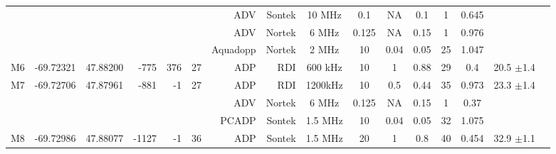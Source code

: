 \documentclass[letterpaper,10pt,landscape]{article}
\begin{document}
\begin{table}
\begin{tabular}{|r|c|c|r|r|r|r|r|c|c|c|c|c|c|c|c|}
    ~                   &                            &                           &                        &                      &                     & ADV          & Sontek     & 10 MHz    & 0.1       & NA       & 0.1        & 1          & 0.645      &                                    \\ 
    ~                   &                            &                           &                        &                      &                     & ADV          & Nortek     & 6 MHz     & 0.125     & NA       & 0.15       & 1          & 0.976      &                                    \\ %
    ~                   &                            &                           &                        &                      &                     & Aquadopp     & Nortek     & 2 MHz     & 10        & 0.04     & 0.05       & 25         & 1.047      &                                    \\\hline
    M6                  & -69.72321                  & 47.88200                  & -775                   & 376                  & 27                  & ADP          & RDI        & 600 kHz   & 10        & 1        & 0.88       & 29         & 0.4        &  20.5 $\pm$1.4                     \\\hline
    \multirow{3}{*}{M7} & \multirow{3}{*}{-69.72706} & \multirow{3}{*}{47.87961} & \multirow{3}{*}{-881}  & \multirow{3}{*}{-1}  & \multirow{3}{*}{27} & ADP          & RDI        & 1200kHz   & 10        & 0.5      & 0.44       & 35         & 0.973      &  \multirow{3}{*}{23.3 $\pm$1.4}    \\ 
    ~                   &                            &                           &                        &                      &                     & ADV          & Nortek     & 6 MHz     & 0.125     & NA       & 0.15       & 1          & 0.37       &                                    \\ %
    ~                   &                            &                           &                        &                      &                     & PCADP        & Sontek     & 1.5 MHz   & 10        & 0.04     & 0.05       & 32         & 1.075      &                                    \\\hline
    \multirow{4}{*}{M8} & \multirow{4}{*}{-69.72986} & \multirow{4}{*}{47.88077} & \multirow{4}{*}{-1127} & \multirow{4}{*}{-1}  & \multirow{4}{*}{36} & ADP          & Sontek     & 1.5 MHz   & 20        & 1        & 0.8        & 40         & 0.454      &  \multirow{4}{*}{32.9 $\pm$1.1}    \\ 

\end{tabular}
\end{table}
\end{document}
